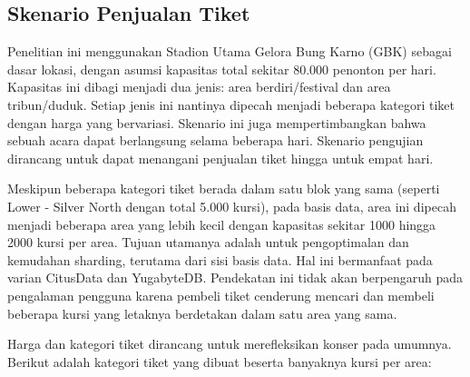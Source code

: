 \subsection{Skenario Penjualan Tiket}

Penelitian ini menggunakan Stadion Utama Gelora Bung Karno (GBK) sebagai dasar lokasi, dengan asumsi kapasitas total sekitar 80.000 penonton per hari. Kapasitas ini dibagi menjadi dua jenis: area berdiri/festival dan area tribun/duduk. Setiap jenis ini nantinya dipecah menjadi beberapa kategori tiket dengan harga yang bervariasi. Skenario ini juga mempertimbangkan bahwa sebuah acara dapat berlangsung selama beberapa hari. Skenario pengujian dirancang untuk dapat menangani penjualan tiket hingga untuk empat hari.

Meskipun beberapa kategori tiket berada dalam satu blok yang sama (seperti Lower - Silver North dengan total 5.000 kursi), pada basis data, area ini dipecah menjadi beberapa area yang lebih kecil dengan kapasitas sekitar 1000 hingga 2000 kursi per area. Tujuan utamanya adalah untuk pengoptimalan dan kemudahan sharding, terutama dari sisi basis data. Hal ini bermanfaat pada varian CitusData dan YugabyteDB. Pendekatan ini tidak akan berpengaruh pada pengalaman pengguna karena pembeli tiket cenderung mencari dan membeli beberapa kursi yang letaknya berdetakan dalam satu area yang sama.

Harga dan kategori tiket dirancang untuk merefleksikan konser pada umumnya. Berikut adalah kategori tiket yang dibuat beserta banyaknya kursi per area:

